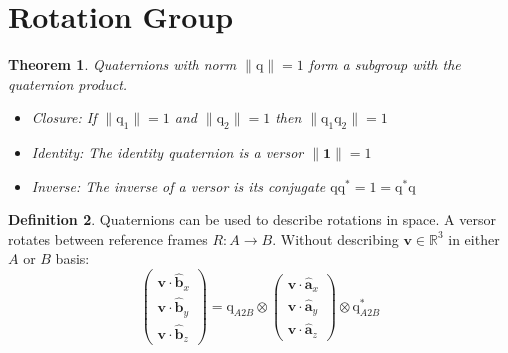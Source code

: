 \documentclass{amsart}
\newtheorem{theorem}{Theorem}[section]
\theoremstyle{definition}
\newtheorem{definition}[theorem]{Definition}
\theoremstyle{remark}
\numberwithin{equation}{section}
\begin{document}
\section{Rotation Group}

\begin{theorem}
  Quaternions with norm $\|\mathrm{q}\|=1$ form a subgroup with the quaternion product.
	\begin{itemize}
	\item Closure: If $\|\mathrm{q}_1\|=1$ and $\|\mathrm{q}_2\|=1$ then $\|\mathrm{q}_1\mathrm{q}_2\|=1$
	\item Identity: The identity quaternion is a versor $\|\mathbf{1}\|=1$
	\item Inverse: The inverse of a versor is its conjugate $\mathrm{q}\mathrm{q}^*=1=\mathrm{q}^*\mathrm{q}$
	\end{itemize}
\end{theorem}


\begin{definition}
  Quaternions can be used to describe rotations in space. A versor rotates between reference frames $R:A\to B$. Without describing $\mathbf{v}\in\mathbb{R}^3$ in either $A$ or $B$ basis:
  \begin{equation}
    \begin{pmatrix}
      \mathbf{v} \cdot \mathbf{\hat{b}}_x \\
      \mathbf{v} \cdot \mathbf{\hat{b}}_y \\
      \mathbf{v} \cdot \mathbf{\hat{b}}_z
    \end{pmatrix}
    = \mathrm{q}_{A2B} \otimes
    \begin{pmatrix}
      \mathbf{v} \cdot \mathbf{\hat{a}}_x \\
      \mathbf{v} \cdot \mathbf{\hat{a}}_y \\
      \mathbf{v} \cdot \mathbf{\hat{a}}_z
    \end{pmatrix}
    \otimes \mathrm{q}_{A2B}^*
  \end{equation}
\end{definition}
\end{document}
